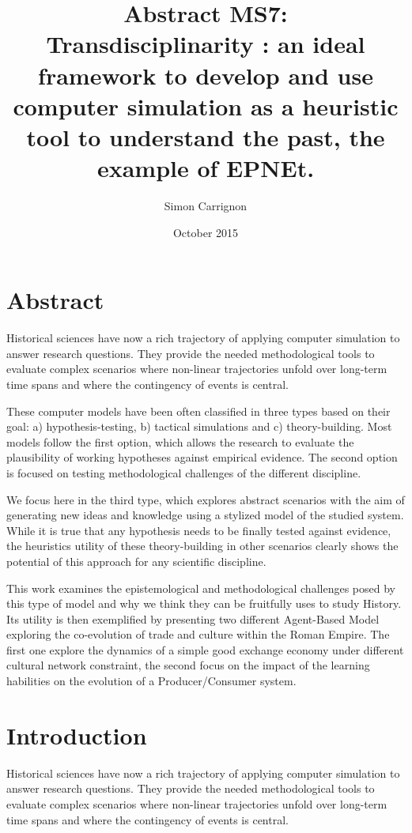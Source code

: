\documentclass[a4paper]{article}
\title{Abstract MS7:\\ Transdisciplinarity : an ideal framework to develop and use computer simulation as a heuristic tool to understand the past, the example of EPNEt.}
\author{Simon Carrignon}
\date{October 2015}
\begin{document}
\maketitle 


\section*{Abstract}
Historical sciences have now a rich trajectory of applying computer simulation to answer research questions. They provide the needed methodological tools to evaluate complex scenarios where non-linear trajectories unfold over long-term time spans and where the contingency of events is central.

These computer models have been often classified in three types based on their goal: a) hypothesis-testing, b) tactical simulations and c) theory-building. Most models follow the first option, which allows the research to evaluate the plausibility of working hypotheses against empirical evidence. The second option is focused on testing methodological challenges of the different discipline.

We focus here in the third type, which explores abstract scenarios with the aim of generating new ideas and knowledge using a stylized model of the studied system. While it is true that any hypothesis needs to be finally tested against evidence, the heuristics utility of these theory-building in other scenarios clearly shows the potential of this approach for any scientific discipline. 

This work examines the epistemological and methodological challenges posed by this type of model and why we think they can be fruitfully uses to study History. Its utility is then exemplified by presenting two different Agent-Based Model exploring the co-evolution of trade and culture within the Roman Empire. The first one explore the dynamics of a simple good exchange economy under different cultural network constraint, the second focus on the impact of the learning habilities on the evolution of a Producer/Consumer system.

\section{Introduction}
Historical sciences have now a rich trajectory of applying computer simulation to answer research questions. They provide the needed methodological tools to evaluate complex scenarios where non-linear trajectories unfold over long-term time spans and where the contingency of events is central.
\end{document}
